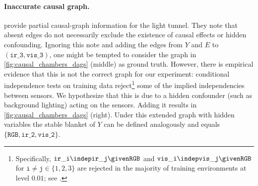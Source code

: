 \paragraph{Inaccurate causal graph.}
\citet{gamellaCausalChambersRealworld2025} provide partial causal-graph
information for the light tunnel. 
They note that absent edges do not necessarily exclude the existence of
causal effects or hidden confounding.
Ignoring this note and adding the edges from $Y$ and $E$ to
$(\mathtt{ir\_3}, \mathtt{vis\_3})$, one might be tempted to consider the graph in \cref{fig:causal_chambers_dags} (middle) as ground truth.
However, 
there is empirical evidence that this
is not the correct graph for our experiment:
conditional independence tests on training data reject\footnote{Specifically, $\mathtt{ir\_i} \indep \mathtt{ir\_j} \given \mathtt{RGB}$ and $\mathtt{vis\_i} \indep \mathtt{vis\_j} \given \mathtt{RGB}$ for $\mathtt{i} \ne \mathtt{j} \in \{1, 2, 3\}$ are rejected in the majority of training environments at level $0.01$; see .} some of the implied independencies between sensors. %
We
hypothesize that this is due to a hidden confounder (such as background
lighting) acting on the sensors. Adding it results in \cref{fig:causal_chambers_dags} (right). Under this extended graph with hidden variables the stable blanket of $Y$
can be defined analogously \citep{xiangStableBlanketHidden2026} and
equals $\{\mathtt{RGB}, \mathtt{ir\_2}, \mathtt{vis\_2}\}$. 


